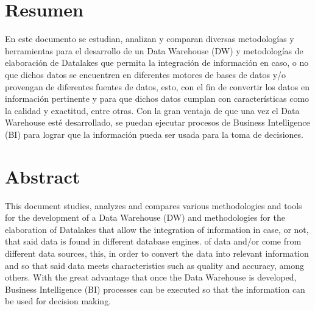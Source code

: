 \documentclass[twoside,twocolumn]{article}
\begin{document}
\maketitle


\section{Resumen}
En este documento se estudian, analizan y comparan diversas metodologías y herramientas para el desarrollo de un Data Warehouse (DW) y metodologías de elaboración de Datalakes que permita la integración de información en caso, o no que dichos datos se encuentren en diferentes motores de bases de datos y/o provengan de diferentes fuentes de datos, esto, con el fin de convertir los datos en información pertinente y para que dichos datos cumplan con características como la calidad y exactitud, entre otras. Con la gran ventaja de que una vez el Data Warehouse esté desarrollado, se puedan ejecutar procesos de Business Intelligence (BI) para lograr que la información pueda ser usada para la toma de decisiones. 


\section{Abstract}

This document studies, analyzes and compares various methodologies and tools for the development of a Data Warehouse (DW) and methodologies for the elaboration of Datalakes that allow the integration of information in case, or not, that said data is found in different database engines. of data and/or come from different data sources, this, in order to convert the data into relevant information and so that said data meets characteristics such as quality and accuracy, among others. With the great advantage that once the Data Warehouse is developed, Business Intelligence (BI) processes can be executed so that the information can be used for decision making. 



\end{document}
